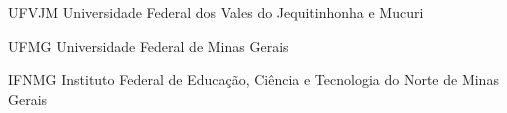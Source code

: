 
\cleardoublepage
\begin{siglas}
\item [UFVJM] Universidade Federal dos Vales do Jequitinhonha e Mucuri
\item [UFMG] Universidade Federal de Minas Gerais
\item [IFNMG] Instituto Federal de Educação, Ciência e Tecnologia do Norte de Minas Gerais
\end{siglas}